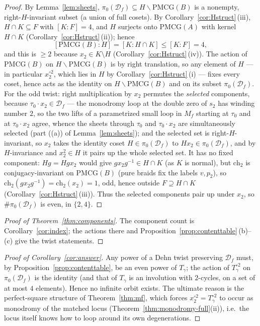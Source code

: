 \documentclass[11pt]{article}
\theoremstyle{definition}
\theoremstyle{remark}
\newcommand{\PMCG}{\mathrm{PMCG}}
\newcommand{\Df}{\mathcal D_f}
\begin{document}
\begin{proof}
By Lemma~\ref{lem:sheets}, $\pi_0(\Df)\subseteq H\backslash\PMCG(B)$
is a nonempty, right-$H$-invariant subset (a union of full cosets).
By Corollary~\ref{cor:Hstruct}\,(iii),
$H\cap K\subseteq F$ with $[K:F]=4$, and $H$ surjects onto
$\PMCG(A)$ with kernel $H\cap K$
\textup{(}Corollary~\ref{cor:Hstruct}\,(ii)\textup{)}; hence
\[
[\PMCG(B):H]=[K:H\cap K]\le [K:F]=4,
\]
and this is $\ge2$ because $x_2\in K\setminus H$
\textup{(}Corollary~\ref{cor:Hstruct}\,(iv)\textup{)}.  The action of
$\PMCG(B)$ on $H\backslash\PMCG(B)$ is by right translation, so any
element of $H$ — in particular $x_2^{\circ2}$, which lies in $H$ by
Corollary~\ref{cor:Hstruct}\,(i) — fixes every coset, hence acts as
the identity on $H\backslash\PMCG(B)$ and on its subset $\pi_0(\Df)$.
For the odd twist: right multiplication by $x_2$ permutes the
\emph{selected} components, because $\tau_0\cdot x_2\in\Df$ — the
monodromy loop at the double zero of $s_2$ has winding number $2$, so
the two lifts of a parametrized small loop in $M_f$ starting at
$\tau_0$ and at $\tau_0\cdot x_2$ agree, whence the sheets through
$\tau_0$ and $\tau_0\cdot x_2$ are simultaneously selected
\textup{(}part \textup{(}(a)\textup{)} of
Lemma~\ref{lem:sheets}\textup{)}; and the selected set is
right-$H$-invariant, so $x_2$ takes the identity coset $H\in\pi_0(\Df)$
to $Hx_2\in\pi_0(\Df)$, and by $H$-invariance and
$x_2^2\in H$ it pairs up the whole selected set.  It has no fixed
component: $Hg=Hgx_2$ would give $gx_2g^{-1}\in H\cap K$
\textup{(}as $K$ is normal\textup{)}, but $\mathrm{ch}_2$ is
conjugacy-invariant on $\PMCG(B)$ \textup{(}pure braids fix the labels
$v,p_2$\textup{)}, so
$\mathrm{ch}_2(gx_2g^{-1})=\mathrm{ch}_2(x_2)=1$, odd, hence outside
$F\supseteq H\cap K$ \textup{(}Corollary~\ref{cor:Hstruct}\,(iii)\textup{)}.
Thus the selected components pair up under $x_2$, so
$\#\pi_0(\Df)$ is even, in $\{2,4\}$.
\end{proof}

\begin{proof}[Proof of Theorem~\ref{thm:components}]
The component count is Corollary~\ref{cor:index}; the actions there and
Proposition~\ref{prop:contenttable}\,(b)–(c) give the twist statements.
\end{proof}

\begin{proof}[Proof of Corollary~\ref{cor:answer}]
Any power of a Dehn twist preserving $\Df$ must, by
Proposition~\ref{prop:contenttable}, be an even power of $T_\gamma$;
the action of $T_\gamma^{\circ2}$ on $\pi_0(\Df)$ is the identity
\textup{(}and that of $T_\gamma$ is an involution with $2$-cycles,
on a set of at most $4$ elements\textup{)}.  Hence no infinite orbit
exists.  The
ultimate reason is the perfect-square structure of
Theorem~\ref{thm:mf}, which forces $x_2^{\circ2}=T_\gamma^{\circ2}$ to
occur as monodromy of the matched locus (Theorem~\ref{thm:monodromy-full}(ii)),
i.e.\ the locus itself knows how to loop around its own
degenerations.
\end{proof}
\end{document}
